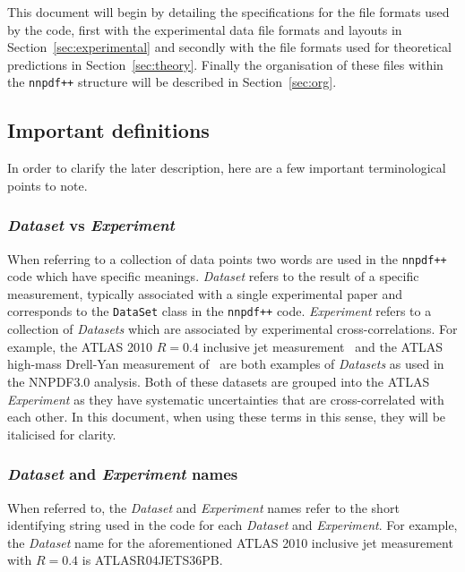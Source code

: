 \documentclass[11pt]{article}
\begin{document}
This document will begin by detailing the specifications for the file formats used by the code, first with the experimental data file formats and layouts in Section~\ref{sec:experimental} and secondly with the file formats used for theoretical predictions in Section~\ref{sec:theory}. Finally the organisation of these files within the {\tt nnpdf++} structure will be described in Section~\ref{sec:org}.

\subsection{Important definitions}
In order to clarify the later description, here are a few important terminological points to note.

\subsubsection*{\emph{Dataset} vs \emph{Experiment}}
When referring to a collection of data points two words are used in the {\tt nnpdf++} code which have specific meanings.
\emph{Dataset} refers to the result of a specific measurement, typically associated with a single experimental paper and corresponds to the {\tt DataSet} class in the {\tt nnpdf++} code. \emph{Experiment} refers
to a collection of \emph{Datasets} which are associated by experimental cross-correlations. For example, the ATLAS 2010 $R=0.4$ inclusive jet measurement~\cite{Aad:2011fc}
and the ATLAS high-mass Drell-Yan measurement of~\cite{Aad:2013iua} are both examples of \emph{Datasets} as used in the NNPDF3.0 analysis. Both of these datasets are
grouped into the ATLAS \emph{Experiment} as they have systematic uncertainties that are cross-correlated with each other. In this document, when using these terms in
this sense, they will be italicised for clarity.

\subsubsection*{\emph{Dataset} and \emph{Experiment} names}
When referred to, the \emph{Dataset} and \emph{Experiment} names refer to the short identifying string used in the code for each \emph{Dataset} and \emph{Experiment}.
For example, the \emph{Dataset} name for the aforementioned ATLAS 2010 inclusive jet measurement with $R=0.4$ is \mbox{ATLASR04JETS36PB}.
\end{document}

